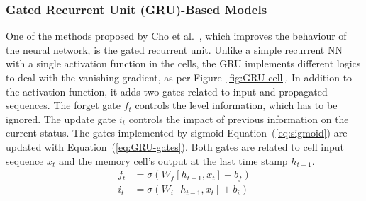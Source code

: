 %
\subsubsection{Gated Recurrent Unit (GRU)-Based Models} \label{subsub:gru}
One of the methods proposed by Cho et al.~\cite{GRU_cho_properties_2014}, which improves the behaviour of the neural network, is the gated recurrent unit.
Unlike a simple recurrent NN with a single activation function in the cells, the GRU implements different logics to deal with the vanishing gradient, as per \mbox{Figure~\ref{fig:GRU-cell}}.
In addition to the activation function, it adds two gates related to input and propagated sequences.
The forget gate $f_t$ controls the level information, which has to be ignored.
The update gate $i_t$ controls the impact of previous information on the current status.
The gates implemented by sigmoid \mbox{Equation~(\ref{eq:sigmoid})} are updated with \mbox{Equation~(\ref{eq:GRU-gates})}.
Both gates are related to cell input sequence $x_t$ and the memory cell's output at the last time stamp $h_{t-1}$.
\begin{equation}
    \begin{split}
        f_t &= \sigma \left( W_{f} \left[ h_{t-1}, x_t \right] + b_f \right) \\
        i_t &= \sigma \left( W_{i} \left[ h_{t-1}, x_t \right] + b_i \right)
    \end{split}
    \label{eq:GRU-gates}
\end{equation}

